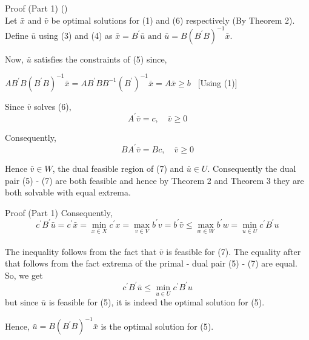 \documentclass[9pt]{beamer}
\begin{document}
\begin{frame}{Proof (Part 1)}
(\Rightarrow) \\
Let $ \bar{x} $ and $ \bar{v} $ be optimal solutions for (1) and (6) respectively (By Theorem 2). Define $ \bar{u} $ using (3) and (4) as $ \bar{x}=B^{\prime} \bar{u} \text { and } \bar{u}=B\left(B^{\prime} B\right)^{-1} \bar{x} $.\\
\vspace{0.1cm}

Now, $ \bar{u} $ satisfies the constraints of (5) since,\\
\vspace{0.2cm}
\begin{center}
$ A B^{\prime} B\left(B^{\prime} B\right)^{-1} \bar{x} = A B^{\prime} B B^{-1} (B^{\prime})^{-1} \bar{x} = A \bar{x} \geq b $ \ [Using (1)]\\
\end{center}
\vspace{0.1cm}

Since $ \bar{v} $ solves (6),
\begin{equation}
A^{\prime} \bar{v}=c, \quad \bar{v} \geq 0
\end{equation}

Consequently, 
\begin{equation}
B A^{\prime} \bar{v}=B c, \quad \bar{v} \geq 0
\end{equation}

Hence $ \bar{v} \in W $, the dual feasible region of (7) and $ \bar{u} \in U $. Consequently the dual pair (5) - (7) are both feasible and hence by Theorem 2 and Theorem 3 they are both solvable with equal extrema.\\
\end{frame}

\begin{frame}{Proof (Part 1)}
Consequently, 
\begin{equation}
c^{\prime} B^{\prime} \bar{u}=c^{\prime} \bar{x}=\min _{x \in X} c^{\prime} x=\max _{v \in V} b^{\prime} v=b^{\prime} \bar{v} \leq \max _{w \in W} b^{\prime} w=\min _{u \in U} c^{\prime} B^{\prime} u
\end{equation}
\\

The inequality follows from the fact that $ \bar{v} $ is feasible for (7). The equality after that follows from the fact extrema of the primal - dual pair (5) - (7) are equal.\\

So, we get $$ c^{\prime} B^{\prime} \bar{u} \leq \min _{u \in U} c^{\prime} B^{\prime} u $$ but since $ \bar{u} $ is feasible for (5), it is indeed the optimal solution for (5).\\
\vspace{0.2cm}

Hence, $ \bar{u} = B\left(B^{\prime} B\right)^{-1} \bar{x} $ is the optimal solution for (5). 
\end{frame}
\end{document}
